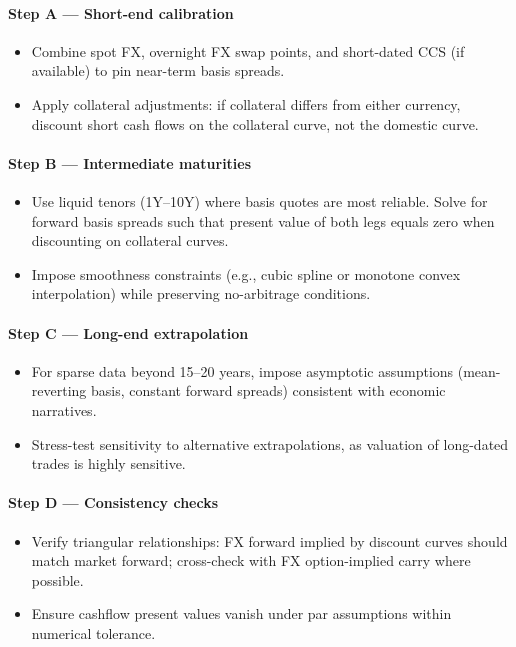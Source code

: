 \documentclass[11pt]{article}
\begin{document}
\paragraph{Step A --- Short-end calibration}
\begin{itemize}[leftmargin=*]
  \item Combine spot FX, overnight FX swap points, and short-dated CCS (if available) to pin near-term basis spreads.
  \item Apply collateral adjustments: if collateral differs from either currency, discount short cash flows on the collateral curve, not the domestic curve.
\end{itemize}

\paragraph{Step B --- Intermediate maturities}
\begin{itemize}[leftmargin=*]
  \item Use liquid tenors (1Y--10Y) where basis quotes are most reliable. Solve for forward basis spreads such that present value of both legs equals zero when discounting on collateral curves.
  \item Impose smoothness constraints (e.g., cubic spline or monotone convex interpolation) while preserving no-arbitrage conditions.
\end{itemize}

\paragraph{Step C --- Long-end extrapolation}
\begin{itemize}[leftmargin=*]
  \item For sparse data beyond 15--20 years, impose asymptotic assumptions (mean-reverting basis, constant forward spreads) consistent with economic narratives.
  \item Stress-test sensitivity to alternative extrapolations, as valuation of long-dated trades is highly sensitive.
\end{itemize}

\paragraph{Step D --- Consistency checks}
\begin{itemize}[leftmargin=*]
  \item Verify triangular relationships: FX forward implied by discount curves should match market forward; cross-check with FX option-implied carry where possible.
  \item Ensure cashflow present values vanish under par assumptions within numerical tolerance.
\end{itemize}
\end{document}
